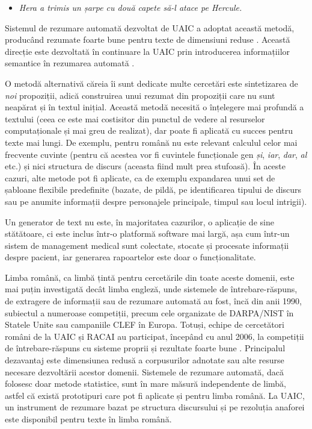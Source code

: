 \begin{multicols}{2}
\begin{itemize}
\item\textit{Hera a trimis un șarpe cu două capete să-l atace pe Hercule.}
\end{itemize}

Sistemul de rezumare automată dezvoltat de UAIC a adoptat această metodă, producând rezumate foarte bune pentru texte de dimensiuni reduse \cite{cristea2}. Această direcție este dezvoltată în continuare la UAIC prin introducerea informațiilor semantice în rezumarea automată \cite{trandabatRez}.

O metodă alternativă căreia îi sunt dedicate multe cercetări este sintetizarea de \textit{noi} propoziții, adică construirea unui rezumat din propoziții care nu sunt neapărat și în textul inițial. Această metodă necesită o înțelegere mai profundă a textului (ceea ce este mai costisitor din punctul de vedere al resurselor computaționale și mai greu de realizat), dar poate fi aplicată cu succes pentru texte mai lungi. De exemplu, pentru română nu este relevant calculul celor mai frecvente cuvinte (pentru că acestea vor fi cuvintele funcționale gen \textit{și}, \textit{iar}, \textit{dar}, \textit{al} etc.) și nici structura de discurs (aceasta fiind mult prea stufoasă). În aceste cazuri, alte metode pot fi aplicate, ca de exemplu expandarea unui set de șabloane flexibile predefinite (bazate, de pildă, pe identificarea tipului de discurs sau pe anumite informații despre personajele principale, timpul sau locul intrigii). 

Un generator de text nu este, în majoritatea cazurilor, o aplicație de sine stătătoare, ci este inclus \mbox{într-o} platformă software mai largă, așa cum \mbox{într-un} sistem de management medical sunt colectate, stocate și procesate informații despre pacient, iar generarea rapoartelor este doar o funcționalitate.


Limba română, ca limbă țintă pentru cercetările din toate aceste domenii, este mai puțin investigată decât limba engleză, unde sistemele de întrebare-răspuns, de extragere de informații sau de rezumare automată au fost, încă din anii 1990, subiectul a numeroase competiții, precum cele organizate de DARPA/NIST în Statele Unite sau campaniile CLEF în Europa. Totuși, echipe de cercetători români de la UAIC și RACAI au participat, începând cu anul 2006, la competiții de întrebare-răspuns cu sisteme proprii și rezultate foarte bune \cite{qa}. Principalul dezavantaj este dimensiunea redusă a corpusurilor adnotate sau alte resurse necesare dezvoltării acestor domenii. Sistemele de rezumare automată, dacă folosesc doar metode statistice, sunt în mare măsură independente de limbă, astfel că există prototipuri care pot fi aplicate și pentru limba română. La UAIC, un instrument de rezumare bazat pe structura discursului și pe rezoluția anaforei este disponibil pentru texte în limba română.


\end{multicols}

